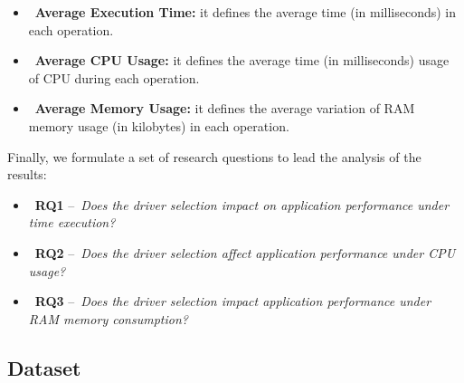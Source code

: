 \documentclass{svproc}
\begin{document}



\begin{itemize}
\item~\textbf{Average Execution Time:} it defines the average time (in milliseconds) in each operation.
\item~\textbf{Average CPU Usage:} it defines the average time (in milliseconds) usage of CPU during each operation.
\item~\textbf{Average Memory Usage:} it defines the average variation of RAM memory usage (in kilobytes) in each operation.
\end{itemize}

Finally, we formulate a set of research questions to lead the analysis of the results:

\begin{itemize}
\item~\textbf{RQ1} --~\emph{Does the driver selection impact on application performance under time execution?}
\item~\textbf{RQ2} --~\emph{Does the driver selection affect application performance under CPU usage?}
\item~\textbf{RQ3} --~\emph{Does the driver selection impact application performance under RAM memory consumption?}
\end{itemize}

\subsection{Dataset}

\end{document}
